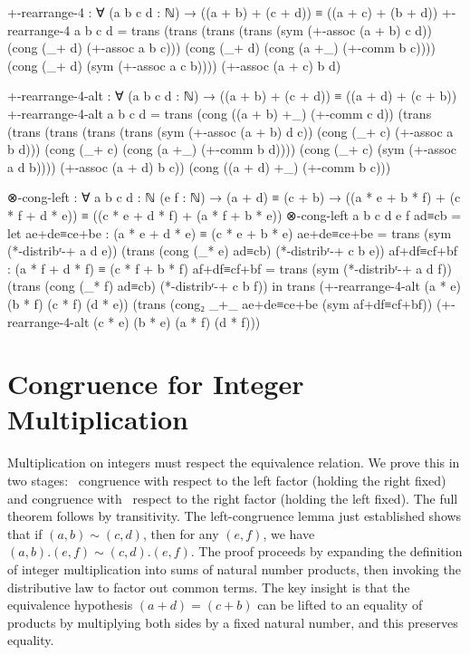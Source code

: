 \documentclass[11pt,a4paper]{book}
\def\cdot{.}%
\begin{document}
\begin{code}
+-rearrange-4 : ∀ (a b c d : ℕ) → ((a + b) + (c + d)) ≡ ((a + c) + (b + d))
+-rearrange-4 a b c d =
  trans (trans (trans (trans (sym (+-assoc (a + b) c d))
                             (cong (_+ d) (+-assoc a b c)))
                      (cong (_+ d) (cong (a +_) (+-comm b c))))
                (cong (_+ d) (sym (+-assoc a c b))))
        (+-assoc (a + c) b d)

+-rearrange-4-alt : ∀ (a b c d : ℕ) → ((a + b) + (c + d)) ≡ ((a + d) + (c + b))
+-rearrange-4-alt a b c d =
  trans (cong ((a + b) +_) (+-comm c d))
        (trans (trans (trans (trans (trans (sym (+-assoc (a + b) d c))
                                            (cong (_+ c) (+-assoc a b d)))
                                     (cong (_+ c) (cong (a +_) (+-comm b d))))
                              (cong (_+ c) (sym (+-assoc a d b))))
                       (+-assoc (a + d) b c))
               (cong ((a + d) +_) (+-comm b c)))

⊗-cong-left : ∀ {a b c d : ℕ} (e f : ℕ)
            → (a + d) ≡ (c + b)
            → ((a * e + b * f) + (c * f + d * e)) ≡ ((c * e + d * f) + (a * f + b * e))
⊗-cong-left {a} {b} {c} {d} e f ad≡cb =
  let ae+de≡ce+be : (a * e + d * e) ≡ (c * e + b * e)
      ae+de≡ce+be = trans (sym (*-distribʳ-+ a d e)) 
                          (trans (cong (_* e) ad≡cb) 
                                 (*-distribʳ-+ c b e))
      af+df≡cf+bf : (a * f + d * f) ≡ (c * f + b * f)
      af+df≡cf+bf = trans (sym (*-distribʳ-+ a d f))
                          (trans (cong (_* f) ad≡cb)
                                 (*-distribʳ-+ c b f))
  in trans (+-rearrange-4-alt (a * e) (b * f) (c * f) (d * e))
           (trans (cong₂ _+_ ae+de≡ce+be (sym af+df≡cf+bf))
                  (+-rearrange-4-alt (c * e) (b * e) (a * f) (d * f)))
\end{code}

\section{Congruence for Integer Multiplication}

Multiplication on integers must respect the equivalence relation. We prove this in two stages: \
congruence with respect to the left factor (holding the right fixed) and congruence with \
respect to the right factor (holding the left fixed). The full theorem follows by transitivity. The left-congruence lemma just established shows that if $(a,b) \sim (c,d)$, then for any $(e,f)$, we have $(a,b) \cdot (e,f) \sim (c,d) \cdot (e,f)$. The proof proceeds by expanding the definition of integer multiplication into sums of natural number products, then invoking the distributive law to factor out common terms. The key insight is that the equivalence hypothesis $(a + d) = (c + b)$ can be lifted to an equality of products by multiplying both sides by a fixed natural number, and this preserves equality.
\end{document}
